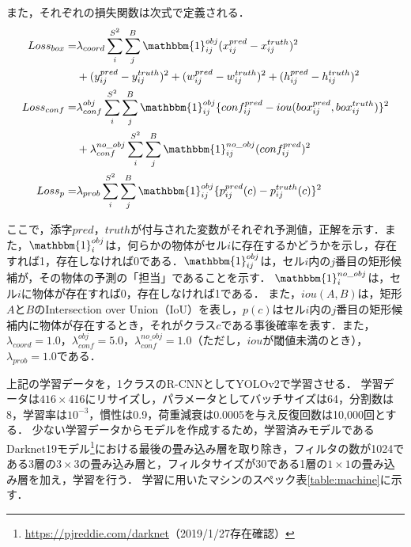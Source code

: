     また，それぞれの損失関数は次式で定義される．
    \begin{align}
      Loss_{box} = &\lambda_{coord} \sum_{i}^{S^2} \sum_{j}^{B} \mathbbm{1}_{ij}^{obj} (x_{ij}^{pred} - x_{ij}^{truth})^2 \\
      &+ (y_{ij}^{pred} - y_{ij}^{truth})^2 + (w_{ij}^{pred} - w_{ij}^{truth})^2 + (h_{ij}^{pred} - h_{ij}^{truth})^2 \notag \\
      Loss_{conf} = &\lambda_{conf}^{obj} \sum_{i}^{S^2} \sum_{j}^{B} \mathbbm{1}_{ij}^{obj}
      \{ conf_{ij}^{pred} - iou(box_{ij}^{pred}, box_{ij}^{truth}) \}^2 \\
      &+ \lambda_{conf}^{no\_obj} \sum_{i}^{S^2} \sum_{j}^{B} \mathbbm{1}_{ij}^{no\_obj} (conf_{ij}^{pred})^2 \notag \\
      Loss_{p} = &\lambda_{prob} \sum_{i}^{S^2} \sum_{j}^{B} \mathbbm{1}_{ij}^{obj}
      \{ p_{ij}^{pred} (c) - p_{ij}^{truth} (c) \}^2
    \end{align}

    ここで，添字$pred$，$truth$が付与された変数がそれぞれ予測値，正解を示す．また，$\mathbbm{1}_{i}^{obj}$は，何らかの物体がセル$i$に存在するかどうかを示し，存在すれば1，存在しなければ0である．$\mathbbm{1}_{ij}^{obj}$は，セル$i$内の$j$番目の矩形候補が，その物体の予測の「担当」であることを示す．
    $\mathbbm{1}_{i}^{no\_obj}$は，セル$i$に物体が存在すれば0，存在しなければ1である．
    また，$iou(A, B)$は，矩形$A$と$B$のIntersection over Union（IoU）を表し，$p(c)$はセル$i$内の$j$番目の矩形候補内に物体が存在するとき，それがクラス$c$である事後確率を表す．また，$\lambda_{coord} = 1.0$，$\lambda_{conf}^{obj} = 5.0$，$\lambda_{conf}^{no\_obj} = 1.0$（ただし，$iou$が閾値未満のとき），$\lambda_{prob} = 1.0$である\cite{Nishikawa:2018}．

    上記の学習データを，1クラスのR-CNNとしてYOLOv2で学習させる．
    学習データは$416 \times 416$にリサイズし，パラメータとしてバッチサイズは64，分割数は8，学習率は$10^{-3}$，慣性は0.9，荷重減衰は0.0005を与え反復回数は10,000回とする．
    少ない学習データからモデルを作成するため，学習済みモデルであるDarknet19モデル\footnote{\url{https://pjreddie.com/darknet}（2019/1/27存在確認）}における最後の畳み込み層を取り除き，フィルタの数が1024である3層の$3 \times 3$の畳み込み層と，フィルタサイズが30である1層の$1 \times 1$の畳み込み層を加え，学習を行う．
    学習に用いたマシンのスペック表\ref{table:machine}に示す．

